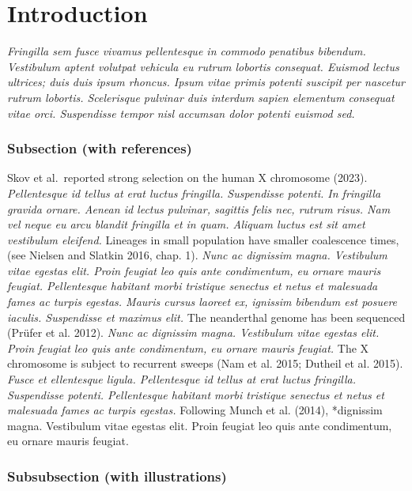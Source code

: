 \documentclass[
  a4paper,
]{scrbook}
\let\oldemph\emph
\renewcommand\emph[1]{\oldemph{\color{gray}#1}}
\renewcommand*\contentsname{Table of contents}
\newcommand\contentsname{Table of contents}
\begin{document}
\renewcommand*\contentsname{Table of contents}
{
\setcounter{tocdepth}{1}
\tableofcontents
}

\mainmatter
\chapter{Introduction}\label{introduction}

\emph{Fringilla sem fusce vivamus pellentesque in commodo penatibus
bibendum. Vestibulum aptent volutpat vehicula eu rutrum lobortis
consequat. Euismod lectus ultrices; duis duis ipsum rhoncus. Ipsum vitae
primis potenti suscipit per nascetur rutrum lobortis. Scelerisque
pulvinar duis interdum sapien elementum consequat vitae orci.
Suspendisse tempor nisl accumsan dolor potenti euismod sed.}

\subsection{Subsection (with
references)}\label{subsection-with-references}

Skov et al.~reported strong selection on the human X chromosome (2023).
\emph{Pellentesque id tellus at erat luctus fringilla. Suspendisse
potenti. In fringilla gravida ornare. Aenean id lectus pulvinar,
sagittis felis nec, rutrum risus. Nam vel neque eu arcu blandit
fringilla et in quam. Aliquam luctus est sit amet vestibulum eleifend.}
Lineages in small population have smaller coalescence times, (see
Nielsen and Slatkin 2016, chap. 1). \emph{Nunc ac dignissim magna.
Vestibulum vitae egestas elit. Proin feugiat leo quis ante condimentum,
eu ornare mauris feugiat. Pellentesque habitant morbi tristique senectus
et netus et malesuada fames ac turpis egestas. Mauris cursus laoreet ex,
ignissim bibendum est posuere iaculis. Suspendisse et maximus elit.} The
neanderthal genome has been sequenced (Prüfer et al. 2012). \emph{Nunc
ac dignissim magna. Vestibulum vitae egestas elit. Proin feugiat leo
quis ante condimentum, eu ornare mauris feugiat.} The X chromosome is
subject to recurrent sweeps (Nam et al. 2015; Dutheil et al. 2015).
\emph{Fusce et ellentesque ligula. Pellentesque id tellus at erat luctus
fringilla. Suspendisse potenti. Pellentesque habitant morbi tristique
senectus et netus et malesuada fames ac turpis egestas.} Following Munch
et al. (2014), *dignissim magna. Vestibulum vitae egestas elit. Proin
feugiat leo quis ante condimentum, eu ornare mauris feugiat.

\subsection{Subsubsection (with
illustrations)}\label{subsubsection-with-illustrations}
\end{document}
